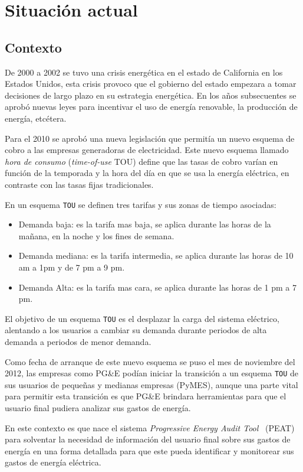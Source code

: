 \chapter{Situación actual}

\section{Contexto}
De 2000 a 2002 se tuvo una crisis energética en el estado de California en los
Estados Unidos, esta crisis provoco que el gobierno del estado empezara a
tomar decisiones de largo plazo en su estrategia energética. En los años
subsecuentes se aprobó nuevas leyes para incentivar el uso de energía renovable,
la producción de energía, etcétera.

Para el 2010 se aprobó una nueva legislación que permitía un nuevo esquema
de cobro a las empresas generadoras de electricidad. Este nuevo esquema
llamado \textit{hora de consumo} (\textit{time-of-use} TOU) define que las
tasas de cobro varían en función de la temporada y la hora del día en que
se usa la energía eléctrica, en contraste con las tasas fijas tradicionales.

En un esquema \texttt{TOU} se definen tres tarifas y sus zonas de tiempo asociadas:

\begin{itemize}
\item  Demanda baja: es la tarifa mas baja, se aplica durante las horas de la
  mañana, en la noche y los fines de semana.
\item Demanda mediana: es la tarifa intermedia, se aplica durante las horas de
  10 am a 1pm y de 7 pm a 9 pm.
\item Demanda Alta: es la tarifa mas cara, se aplica durante las horas de
  1 pm a 7 pm.
\end{itemize}

El objetivo de un esquema \texttt{TOU} es el desplazar la carga del sistema
eléctrico, alentando a los usuarios a cambiar su demanda durante periodos
de alta demanda a periodos de menor demanda.

Como fecha de arranque de este nuevo esquema se puso el mes de noviembre del 2012,
las empresas como PG\&E podían iniciar la transición a un esquema \texttt{TOU}
de sus usuarios de pequeñas y medianas empresas (PyMES), aunque una parte vital
para permitir esta transición es que PG\&E brindara herramientas para que el
usuario final pudiera analizar sus gastos de energía.

En este contexto es que nace el sistema \textit{Progressive Energy Audit Tool}
\ (PEAT) para solventar la necesidad de información del usuario final
sobre sus gastos de energía en una forma detallada para que este pueda
identificar y monitorear sus gastos de energía eléctrica.

